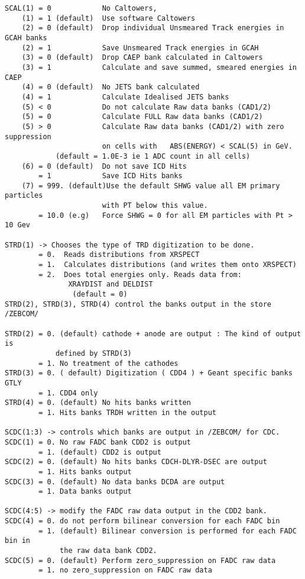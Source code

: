 \begin{verbatim}
SCAL(1) = 0            No Caltowers,
    (1) = 1 (default)  Use software Caltowers
    (2) = 0 (default)  Drop individual Unsmeared Track energies in GCAH banks
    (2) = 1            Save Unsmeared Track energies in GCAH
    (3) = 0 (default)  Drop CAEP bank calculated in Caltowers
    (3) = 1            Calculate and save summed, smeared energies in CAEP
    (4) = 0 (default)  No JETS bank calculated
    (4) = 1            Calculate Idealised JETS banks
    (5) < 0            Do not calculate Raw data banks (CAD1/2)
    (5) = 0            Calculate FULL Raw data banks (CAD1/2)
    (5) > 0            Calculate Raw data banks (CAD1/2) with zero suppression
                       on cells with   ABS(ENERGY) < SCAL(5) in GeV.
            (default = 1.0E-3 ie 1 ADC count in all cells)
    (6) = 0 (default)  Do not save ICD Hits
        = 1            Save ICD Hits banks
    (7) = 999. (default)Use the default SHWG value all EM primary particles
                       with PT below this value.
        = 10.0 (e.g)   Force SHWG = 0 for all EM particles with Pt > 10 Gev

STRD(1) -> Chooses the type of TRD digitization to be done.
        = 0.  Reads distributions from XRSPECT
        = 1.  Calculates distributions (and writes them onto XRSPECT)
        = 2.  Does total energies only. Reads data from:
               XRAYDIST and DELDIST
                (default = 0)
STRD(2), STRD(3), STRD(4) control the banks output in the store /ZEBCOM/

STRD(2) = 0. (default) cathode + anode are output : The kind of output is
            defined by STRD(3)
        = 1. No treatment of the cathodes
STRD(3) = 0. ( default) Digitization ( CDD4 ) + Geant specific banks GTLY
        = 1. CDD4 only
STRD(4) = 0. (default) No hits banks written
        = 1. Hits banks TRDH written in the output

SCDC(1:3) -> controls which banks are output in /ZEBCOM/ for CDC.
SCDC(1) = 0. No raw FADC bank CDD2 is output
        = 1. (default) CDD2 is output
SCDC(2) = 0. (default) No hits banks CDCH-DLYR-DSEC are output
        = 1. Hits banks output
SCDC(3) = 0. (default) No data banks DCDA are output
        = 1. Data banks output

SCDC(4:5) -> modify the FADC raw data output in the CDD2 bank.
SCDC(4) = 0. do not perform bilinear conversion for each FADC bin
        = 1. (default) Bilinear conversion is performed for each FADC bin in
             the raw data bank CDD2.
SCDC(5) = 0. (default) Perform zero_suppression on FADC raw data
        = 1. no zero_suppression on FADC raw data



\end{verbatim}
